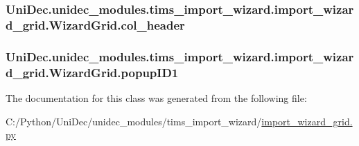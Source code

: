 \subsubsection[{col\+\_\+header}]{\setlength{\rightskip}{0pt plus 5cm}Uni\+Dec.\+unidec\+\_\+modules.\+tims\+\_\+import\+\_\+wizard.\+import\+\_\+wizard\+\_\+grid.\+Wizard\+Grid.\+col\+\_\+header}\label{class_uni_dec_1_1unidec__modules_1_1tims__import__wizard_1_1import__wizard__grid_1_1_wizard_grid_a27535e55c70374fe40027522f222647b}
\hypertarget{class_uni_dec_1_1unidec__modules_1_1tims__import__wizard_1_1import__wizard__grid_1_1_wizard_grid_a020eb728ecb3c25f2165b72479f0a553}{}
\subsubsection[{popup\+I\+D1}]{\setlength{\rightskip}{0pt plus 5cm}Uni\+Dec.\+unidec\+\_\+modules.\+tims\+\_\+import\+\_\+wizard.\+import\+\_\+wizard\+\_\+grid.\+Wizard\+Grid.\+popup\+I\+D1}\label{class_uni_dec_1_1unidec__modules_1_1tims__import__wizard_1_1import__wizard__grid_1_1_wizard_grid_a020eb728ecb3c25f2165b72479f0a553}


The documentation for this class was generated from the following file\+:\begin{DoxyCompactItemize}
\item 
C\+:/\+Python/\+Uni\+Dec/unidec\+\_\+modules/tims\+\_\+import\+\_\+wizard/\hyperlink{import__wizard__grid_8py}{import\+\_\+wizard\+\_\+grid.\+py}\end{DoxyCompactItemize}
